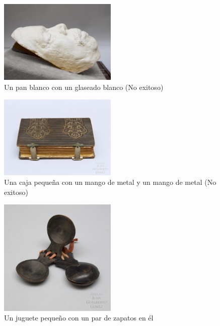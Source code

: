 \begin{figure}[h!]
    \centering
    \includegraphics[width=0.5\textwidth]{Graphics/un pan blanco con un glaseado blanco.jpg}
        \caption{Un pan blanco con un glaseado blanco (No exitoso)}
    \end{figure}
    \begin{figure}[h!]
        \centering
        \includegraphics[width=0.5\textwidth]{Graphics/una caja pequenha con un mango de metal y un mango de metal.jpg}
        \caption{Una caja pequeña con un mango de metal y un mango de metal (No exitoso)}
    \end{figure}
    \begin{figure}[h!]
        \centering
        \includegraphics[width=0.5\textwidth]{Graphics/un juguete pequenho con un par de zapatos en el.jpg}
        \caption{Un juguete pequeño con un par de zapatos en él }
\end{figure}
